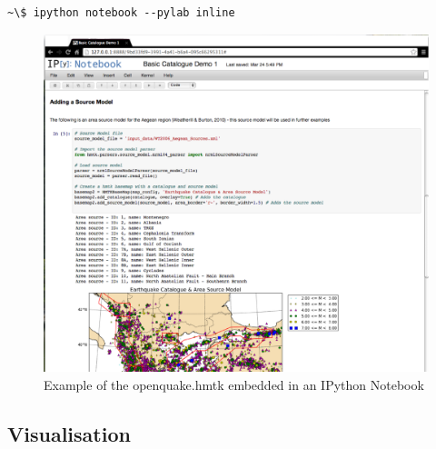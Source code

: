 \begin{Verbatim}[frame=single, commandchars=\\\{\}, fontsize=\scriptsize]
~\$ ipython notebook --pylab inline
\end{Verbatim}

\begin{figure}[htb]
  \centering
      \includegraphics[width=\textwidth]{./figures/hmtk_notebook_screenshot.eps}
  \caption{Example of the openquake.hmtk embedded in an IPython Notebook}
  \label{fig:notebook}
\end{figure}


%
%

\subsection{Visualisation}

